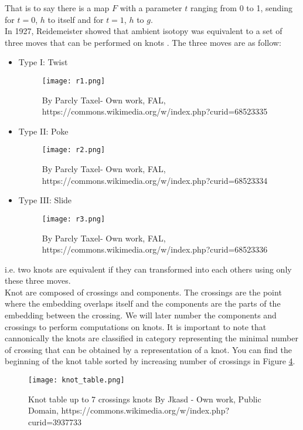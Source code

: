 \documentclass[12pt, a4paper]{article}
\begin{document}
That is to say there is a map $F$ with a parameter $t$ ranging from 0 to 1, sending for $t=0$, $h$ to itself and for $t = 1$, $h$ to $g$.\\

In 1927, Reidemeister showed that ambient isotopy was equivalent to a set of three moves that can be performed on knots \cite{reidemeister_elementare_1927}. The three moves are as follow:

\begin{itemize}
    \item Type I: Twist
\begin{figure}[H]
             \centering
            \texttt{[image: r1.png]}
          \caption{By Parcly Taxel- Own work, FAL, https://commons.wikimedia.org/w/index.php?curid=68523335}
        \label{fig:r_1}
\end{figure}
    \item Type II: Poke
\begin{figure}[H]
             \centering
            \texttt{[image: r2.png]}
          \caption{By Parcly Taxel- Own work, FAL, https://commons.wikimedia.org/w/index.php?curid=68523334}
        \label{fig:r_2}
\end{figure}
    \item Type III: Slide 
\begin{figure}[H]
             \centering
            \texttt{[image: r3.png]}
          \caption{By Parcly Taxel- Own work, FAL, https://commons.wikimedia.org/w/index.php?curid=68523336}
        \label{fig:r_3}
\end{figure}
  \end{itemize}

i.e. two knots are equivalent if they can transformed into each others using only these three moves.\\

Knot are composed of crossings and components. The crossings are the point where the embedding overlaps itself and the components are the parts of the embedding between the crossing. We will later number the components and crossings to perform computations on knots. It is important to note that cannonically the knots are classified in category representing the minimal number of crossing that can be obtained by a representation of a knot. You can find the beginning of the knot table sorted by increasing number of crossings in Figure \ref{fig:knot_table}.

\begin{figure}[H]
  \centering
  \texttt{[image: knot\_table.png]}
  \caption{Knot table up to 7 crossings knots By Jkasd - Own work, Public Domain, https://commons.wikimedia.org/w/index.php?curid=3937733}
  \label{fig:knot_table}
\end{figure}
\end{document}
